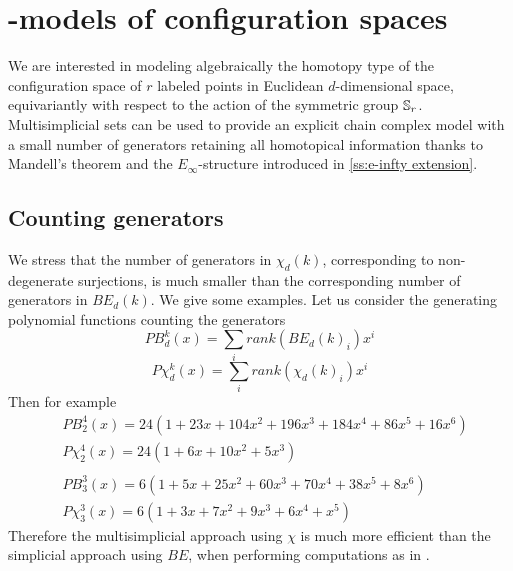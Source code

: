 
\section{\pdfEinfty-models of configuration spaces}


We are interested in modeling algebraically the homotopy type of the configuration space of $r$ labeled points in Euclidean $d$-dimensional space, equivariantly with respect to the action of the symmetric group $\mathbb{S}_r$.
Multisimplicial sets can be used to provide an explicit chain complex model with a small number of generators retaining all homotopical information thanks to Mandell's theorem \cite{mandell2006homotopy_type} and the $E_\infty$-structure introduced in \cref{ss:e-infty extension}.





\subsection{Counting generators}

We stress that the number of generators in $\chi_d(k)$, corresponding to non-degenerate surjections, is much smaller than the corresponding number of generators in $BE_d(k)$.
We give some examples.
Let us consider the generating polynomial functions counting the generators
$$PB_d^k(x) = \sum_i rank(BE_d(k)_i) x^i $$ $$P\chi_d^k(x)=
\sum_i rank(\chi_d(k)_i) x^i$$
Then for example
\begin{align*}
	& PB_2^4(x)=24(1+23x+104x^2+196x^3+184x^4+86x^5+16x^6)\\
	& P\chi_2^4(x)=24(1+6x+10x^2+5x^3) \\
	& \\
	& PB_3^3(x) = 6(1+5x+25x^2+60x^3+70x^4+38x^5+8x^6 ) \\
	&  P\chi_3^3(x)= 6(1+3x+7x^2+9x^3+6x^4+x^5)
\end{align*}
Therefore the multisimplicial approach using $\chi$ is much more efficient than the simplicial
approach using $BE$, when performing computations as in \cite{formality}.

